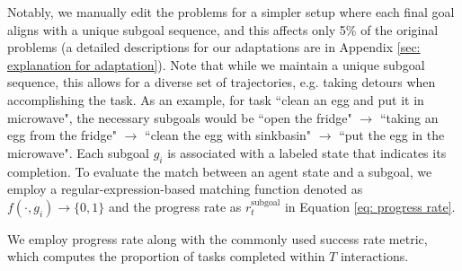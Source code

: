 Notably, we manually edit the problems for a simpler setup where each final goal aligns with a unique subgoal sequence, and this affects only 5\% of the original problems (a detailed descriptions for our adaptations are in Appendix \ref{sec: explanation for adaptation}). Note that while we maintain a unique subgoal sequence,  this allows for a diverse set of trajectories, e.g. taking detours when accomplishing the task.
As an example, for task ``clean an egg and put it in microwave", the necessary subgoals would be ``open the fridge" $\rightarrow$ ``taking an egg from the fridge" $\rightarrow$ ``clean the egg with sinkbasin" $\rightarrow$ ``put the egg in the microwave". Each subgoal $g_i$ is associated with a labeled state that indicates its completion. 
To evaluate the match between an agent state and a subgoal, we employ a regular-expression-based matching function denoted as $f(\cdot, g_i)\rightarrow \{0,1\}$ and the progress rate as $r_t^{\text{subgoal}}$ in Equation \ref{eq: progress rate}.

We employ progress rate along with the commonly used success rate metric, which computes the proportion of tasks completed within $T$ interactions. 




